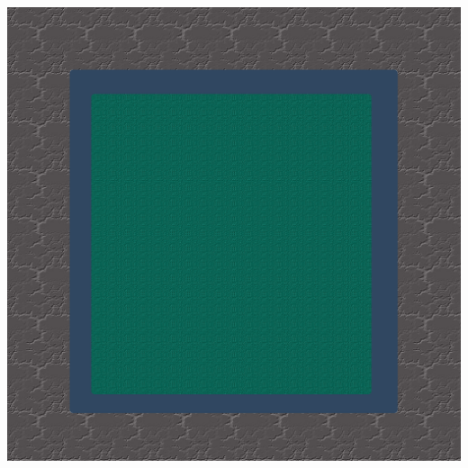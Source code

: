 %
%
\thispagestyle{plain}
\begin{titlepage}
\begin{center}

\begin{flushright}
    \normalsize{
        \textbf{
            \institutname\\
            \institutaddress\\
            \institutlocation
        }
    }
\end{flushright}

\includegraphics[scale=0.4]{media/Logo.png}\\[5ex]

\singlespacing

\Large{\textbf{\textsc{\art}}}\\[1.5ex]

\singlespacing

\large{\textbf{\textsc{\titlename}}}\\[3ex]



\end{center}
\end{titlepage}
